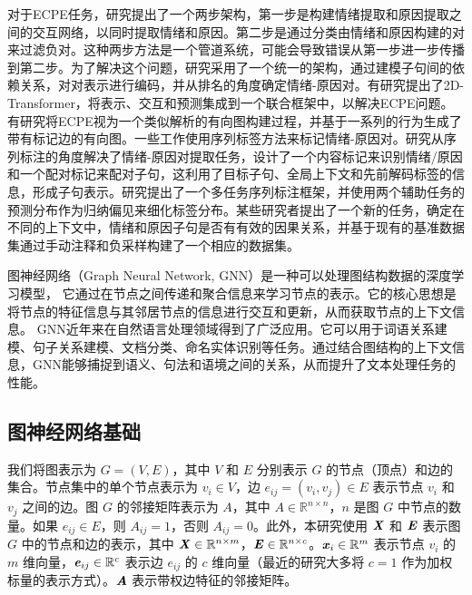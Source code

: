 对于ECPE任务，研究\cite{DBLP:conf/acl/XiaD19}提出了一个两步架构，第一步是构建情绪提取和原因提取之间的交互网络，以同时提取情绪和原因。第二步是通过分类由情绪和原因构建的对来过滤负对。这种两步方法是一个管道系统，可能会导致错误从第一步进一步传播到第二步。为了解决这个问题，研究\cite{DBLP:conf/acl/WeiZM20}采用了一个统一的架构，通过建模子句间的依赖关系，对对表示进行编码，并从排名的角度确定情绪-原因对。有研究\cite{DBLP:conf/acl/DingXY20}提出了2D-Transformer，将表示、交互和预测集成到一个联合框架中，以解决ECPE问题。有研究\cite{DBLP:conf/acl/FanYDGYX20}将ECPE视为一个类似解析的有向图构建过程，并基于一系列的行为生成了带有标记边的有向图。一些工作\cite{DBLP:conf/emnlp/YuanFBX20,DBLP:conf/coling/ChenLW20}使用序列标签方法来标记情绪-原因对。研究\cite{DBLP:journals/taslp/ChengJYLG21}从序列标注的角度解决了情绪-原因对提取任务，设计了一个内容标记来识别情绪/原因和一个配对标记来配对子句，这利用了目标子句、全局上下文和先前解码标签的信息，形成子句表示。研究\cite{DBLP:journals/taslp/FanYGZX21}提出了一个多任务序列标注框架，并使用两个辅助任务的预测分布作为归纳偏见来细化标签分布。某些研究者\cite{DBLP:conf/emnlp/ChenLW20}提出了一个新的任务，确定在不同的上下文中，情绪和原因子句是否有有效的因果关系，并基于现有的基准数据集通过手动注释和负采样构建了一个相应的数据集。



图神经网络（Graph Neural Network, GNN）是一种可以处理图结构数据的深度学习模型，
它通过在节点之间传递和聚合信息来学习节点的表示。它的核心思想是将节点的特征信息与其邻居节点的信息进行交互和更新，从而获取节点的上下文信息。
GNN近年来在自然语言处理领域得到了广泛应用。它可以用于词语关系建模、句子关系建模、文档分类、命名实体识别等任务。通过结合图结构的上下文信息，GNN能够捕捉到语义、句法和语境之间的关系，从而提升了文本处理任务的性能。

\subsection{图神经网络基础}
我们将图表示为 $G = (V, E)$，其中 $V$ 和 $E$ 分别表示 $G$ 的节点（顶点）和边的集合。节点集中的单个节点表示为 $v_i\in V$，边 $e_{ij}=(v_i, v_j)\in E$ 表示节点 $v_i$ 和 $v_j$ 之间的边。图 $G$ 的邻接矩阵表示为 $A$，其中 $A\in \mathbb{R}^{n\times n}$，$n$ 是图 $G$ 中节点的数量。如果 $e_{ij}\in E$，则 $A_{ij}=1$，否则 $A_{ij}=0$。此外，本研究使用 $\textbf{\textit{X}}$ 和 $\textbf{\textit{E}}$ 表示图 $G$ 中的节点和边的表示，其中 $\textbf{\textit{X}}\in \mathbb{R}^{n\times m}$，$\textbf{\textit{E}}\in \mathbb{R}^{n\times c}$。$\textbf{\textit{x}}_i\in \mathbb{R}^m$ 表示节点 $v_i$ 的 $m$ 维向量，$\textbf{\textit{e}}_{ij}\in \mathbb{R}^c$ 表示边 $e_{ij}$ 的 $c$ 维向量（最近的研究大多将 $c=1$ 作为加权标量的表示方式）。$\textbf{\textit{A}}$ 表示带权边特征的邻接矩阵。


